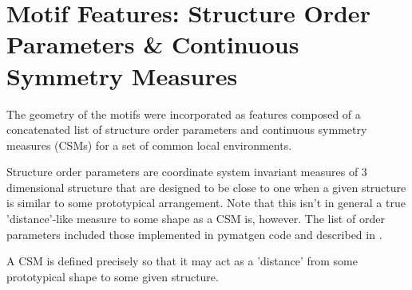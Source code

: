 \documentclass[10pt,a4paper]{article}
\begin{document}
\section{Motif Features: Structure Order Parameters \& Continuous Symmetry Measures}
The geometry of the motifs were incorporated as features composed of a concatenated list of structure order parameters and continuous symmetry measures (CSMs) for a set of common local environments. 

Structure order parameters are coordinate system invariant measures of 3 dimensional structure that are designed to be close to one when a given structure is similar to some prototypical arrangement. Note that this isn't in general a true 'distance'-like measure to some shape as a CSM is, however. The list of order parameters included those implemented in pymatgen code \cite{lsop-pymatgen} and described in \cite{orderparam1, orderparam2}.

A CSM is defined precisely so that it may act as a 'distance' from some prototypical shape to some given structure.
\end{document}

